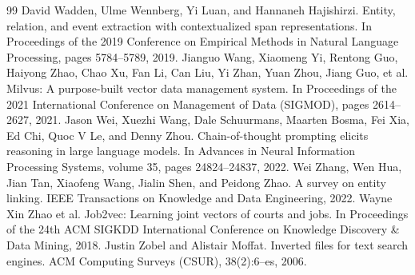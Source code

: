 \begin{thebibliography}{99}
 David Wadden, Ulme Wennberg, Yi Luan, and Hannaneh Hajishirzi. Entity, relation, and event extraction with contextualized span representations. In Proceedings of the 2019 Conference on Empirical Methods in Natural Language Processing, pages 5784--5789, 2019.
 Jianguo Wang, Xiaomeng Yi, Rentong Guo, Haiyong Zhao, Chao Xu, Fan Li, Can Liu, Yi Zhan, Yuan Zhou, Jiang Guo, et al. Milvus: A purpose-built vector data management system. In Proceedings of the 2021 International Conference on Management of Data (SIGMOD), pages 2614--2627, 2021.
 Jason Wei, Xuezhi Wang, Dale Schuurmans, Maarten Bosma, Fei Xia, Ed Chi, Quoc V Le, and Denny Zhou. Chain-of-thought prompting elicits reasoning in large language models. In Advances in Neural Information Processing Systems, volume 35, pages 24824--24837, 2022.
 Wei Zhang, Wen Hua, Jian Tan, Xiaofeng Wang, Jialin Shen, and Peidong Zhao. A survey on entity linking. IEEE Transactions on Knowledge and Data Engineering, 2022.
 Wayne Xin Zhao et al. Job2vec: Learning joint vectors of courts and jobs. In Proceedings of the 24th ACM SIGKDD International Conference on Knowledge Discovery \& Data Mining, 2018.
 Justin Zobel and Alistair Moffat. Inverted files for text search engines. ACM Computing Surveys (CSUR), 38(2):6--es, 2006.
\end{thebibliography}
